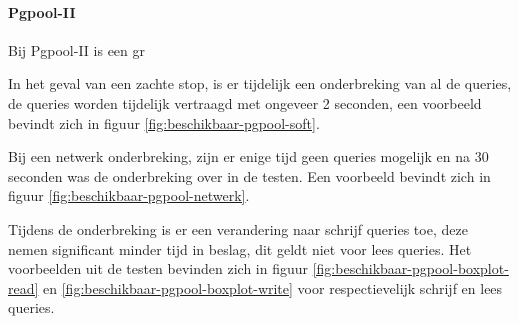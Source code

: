 \paragraph{Pgpool-II} Bij Pgpool-II is een gr\todo{}

In het geval van een zachte stop, is er tijdelijk een onderbreking van al de queries, de queries worden tijdelijk vertraagd met ongeveer 2 seconden, een voorbeeld bevindt zich in figuur \ref{fig:beschikbaar-pgpool-soft}. 

Bij een netwerk onderbreking, zijn er enige tijd geen queries mogelijk en na 30 seconden was de onderbreking over in de testen.  Een voorbeeld bevindt zich in figuur \ref{fig:beschikbaar-pgpool-netwerk}.  

Tijdens de onderbreking is er een verandering naar schrijf queries toe, deze nemen significant minder tijd in beslag, dit geldt niet voor lees queries. Het voorbeelden uit de testen bevinden zich in figuur \ref{fig:beschikbaar-pgpool-boxplot-read} en \ref{fig:beschikbaar-pgpool-boxplot-write} voor respectievelijk schrijf en lees queries. 

